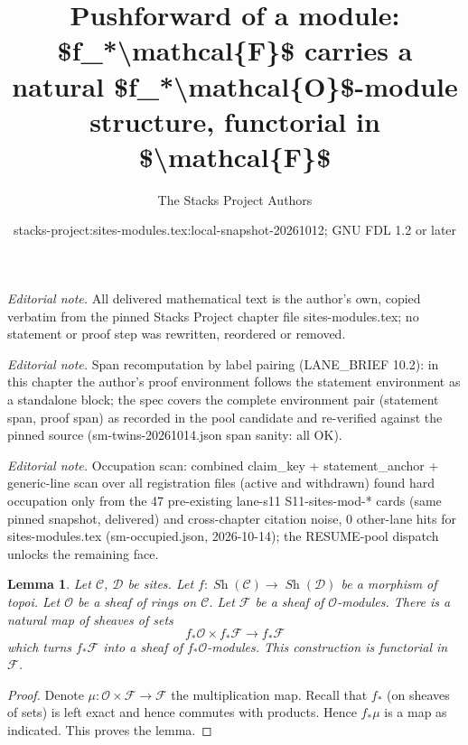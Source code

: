 \documentclass[10pt,a4paper]{amsart}
\title{Pushforward of a module: \$f\_*\textbackslash{}mathcal\{F\}\$ carries a natural \$f\_*\textbackslash{}mathcal\{O\}\$-module structure, functorial in \$\textbackslash{}mathcal\{F\}\$}
\author{The Stacks Project Authors}
\date{stacks-project:sites-modules.tex:local-snapshot-20261012; GNU FDL 1.2 or later}
\theoremstyle{plain}
\newtheorem{lemma}[subsection]{Lemma}
\theoremstyle{definition}
\theoremstyle{remark}
\numberwithin{equation}{subsection}
\def\Sh{\mathop{\mathit{Sh}}\nolimits}
\begin{document}
\maketitle
\noindent\textit{Editorial note.} All delivered mathematical text is the author's own, copied verbatim from the pinned Stacks Project chapter file sites-modules.tex; no statement or proof step was rewritten, reordered or removed.\par\medskip
\noindent\textit{Editorial note.} Span recomputation by label pairing (LANE\_BRIEF 10.2): in this chapter the author's proof environment follows the statement environment as a standalone block; the spec covers the complete environment pair (statement span, proof span) as recorded in the pool candidate and re-verified against the pinned source (sm-twins-20261014.json span sanity: all OK).\par\medskip
\noindent\textit{Editorial note.} Occupation scan: combined claim\_key + statement\_anchor + generic-line scan over all registration files (active and withdrawn) found hard occupation only from the 47 pre-existing lane-s11 S11-sites-mod-* cards (same pinned snapshot, delivered) and cross-chapter citation noise, 0 other-lane hits for sites-modules.tex (sm-occupied.json, 2026-10-14); the RESUME-pool dispatch unlocks the remaining face.\par\medskip
\begin{lemma}
\label{lemma-pushforward-module}
Let $\mathcal{C}$, $\mathcal{D}$ be sites.
Let $f : \Sh(\mathcal{C}) \to \Sh(\mathcal{D})$
be a morphism of topoi.
Let $\mathcal{O}$ be a sheaf of rings on $\mathcal{C}$.
Let $\mathcal{F}$ be a sheaf of $\mathcal{O}$-modules.
There is a natural map of sheaves of sets
$$
f_*\mathcal{O} \times f_*\mathcal{F}
\longrightarrow
f_*\mathcal{F}
$$
which turns $f_*\mathcal{F}$ into a sheaf of $f_*\mathcal{O}$-modules.
This construction is functorial in $\mathcal{F}$.
\end{lemma}

\begin{proof}
Denote $\mu : \mathcal{O} \times \mathcal{F} \to \mathcal{F}$ the
multiplication map. Recall that $f_*$ (on sheaves of sets) is left exact
and hence commutes with products. Hence $f_*\mu$ is a map as
indicated. This proves the lemma.
\end{proof}
\end{document}
